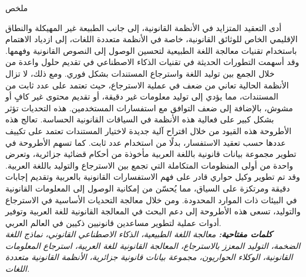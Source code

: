\documentclass[12pt,a4paper]{report}
\begin{document}
	\newpage
	\thispagestyle{empty}
	\begin{center} \end{center}
	\vspace{0.01cm}
	
	\begin{center} {\LARGE ملخص  } \end{center}
	\par أدى التعقيد المتزايد في الأنظمة القانونية، إلى جانب الطبيعة غير المهيكلة والنطاق الإقليمي الخاص للوثائق القانونية، خاصة في الأنظمة متعددة اللغات، إلى ازدياد الاهتمام باستخدام تقنيات معالجة اللغة الطبيعية لتحسين الوصول إلى النصوص القانونية وفهمها. وقد أسهمت التطورات الحديثة في تقنيات الذكاء الاصطناعي في تقديم حلول واعدة من خلال الجمع بين توليد اللغة واسترجاع المستندات بشكل فوري. ومع ذلك، لا تزال الأنظمة الحالية تعاني من ضعف في عملية الاسترجاع، حيث تعتمد على عدد ثابت من المستندات، مما يؤدي إلى توليد معلومات غير دقيقة، أو تقديم محتوى غير كافٍ أو مشوش، بالإضافة إلى ضعف التوافق مع استفسارات المستخدمين. هذه التحديات تؤثر بشكل كبير على فعالية هذه الأنظمة في السياقات القانونية الحساسة.
تعالج هذه الأطروحة هذه القيود من خلال اقتراح آلية جديدة لاختيار المستندات تعتمد على تكييف عددها حسب تعقيد الاستفسار، بدلًا من استخدام عدد ثابت. كما تسهم الأطروحة في تطوير مجموعة بيانات قانونية باللغة العربية مأخوذة من أحكام قضائية جزائرية، وتعرض واحدة من أولى المنظومات المتكاملة التي تجمع بين الاسترجاع والتوليد باللغة العربية. وقد تم تطوير وكيل حواري قادر على فهم الاستفسارات القانونية بالعربية وتقديم إجابات دقيقة ومرتكزة على السياق، مما يُحسّن من إمكانية الوصول إلى المعلومات القانونية في البيئات ذات الموارد المحدودة. ومن خلال معالجة التحديات الأساسية في الاسترجاع والتوليد، تسعى هذه الأطروحة إلى دعم البحث في المعالجة القانونية للغة العربية وتوفير أدوات عملية لتطوير مساعدين قانونيين ذكيين في العالم العربي.\\
	\textbf{\textit{كلمات مفتاحية:}} \textit{معالجة اللغة الطبيعية، الذكاء الاصطناعي القانوني، نماذج اللغة الضخمة، التوليد المعزز بالاسترجاع، المعالجة القانونية للغة العربية،  استرجاع المعلومات القانونية، الوكلاء الحواريون، مجموعة بيانات قانونية جزائرية، الأنظمة القانونية متعددة اللغات.}
	
	\vspace{6cm}
	
\end{document}

